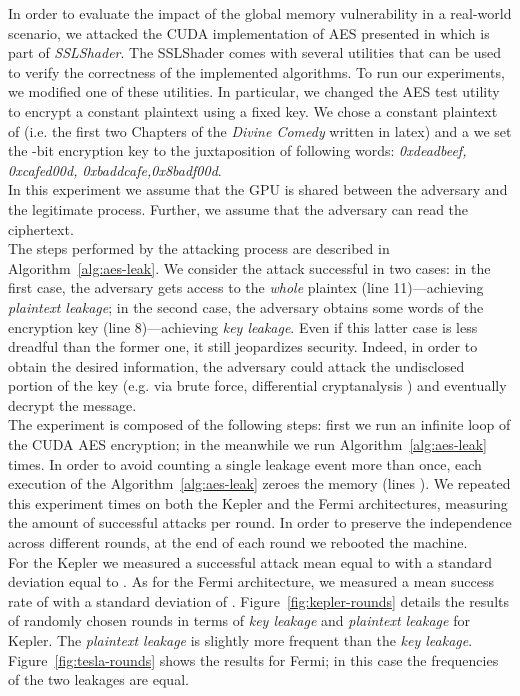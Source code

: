 \documentclass[11pt,onecolumn,letterpaper]{IEEEtran}
\begin{document}
In order to evaluate the impact of the global memory vulnerability in a real-world scenario, we attacked
the CUDA implementation of AES presented in \cite{Jang:2011:SCS:1972457.1972459} which is part of \emph{SSLShader}.  
The SSLShader comes with several utilities that can be used to verify the correctness of the implemented algorithms. 
To run our experiments, we modified one of these utilities. 
In particular, we changed the AES test utility to encrypt a constant plaintext using a fixed key. 
We chose a constant plaintext of  (i.e. the first two Chapters of the \emph{Divine Comedy} written in latex) 
and a we set the -bit encryption key to the juxtaposition of following words: \emph{0xdeadbeef, 0xcafed00d, 0xbaddcafe,0x8badf00d}. \\
In this experiment we assume that the GPU is shared between the adversary and the legitimate process. 
Further, we assume that the adversary can read the ciphertext. \\
The steps performed by the attacking process are described in Algorithm~\ref{alg:aes-leak}. 
We consider the attack successful in two cases:
in the first case, the adversary gets access to the \emph{whole} plaintex (line 11)---achieving \emph{plaintext leakage}; 
in the second case, the adversary obtains some words of the encryption key (line 8)---achieving \emph{key leakage}.
Even if this latter case is less dreadful than the former one, it still jeopardizes security. 
Indeed, in order to obtain the desired information, the adversary could attack the undisclosed portion of the key (e.g. via brute force, differential cryptanalysis \cite{Heys:2002:TLD:763194.763197}) and eventually decrypt the message. \\
The experiment is composed of the following steps: 
first we run an infinite loop of the CUDA AES encryption; 
in the meanwhile we run Algorithm~\ref{alg:aes-leak}  times. 
In order to avoid counting a single leakage event more than once, each execution of the Algorithm~\ref{alg:aes-leak} zeroes the memory (lines ). 
We repeated this experiment  times on both the Kepler and the Fermi architectures, measuring the amount of successful attacks per round. 
In order to preserve the independence across different rounds, at the end of each round we rebooted the machine. \\
For the Kepler we measured a successful attack mean equal to  with a standard deviation equal to .
As for the Fermi architecture, we measured a mean success rate of  with a standard deviation of . 
Figure~\ref{fig:kepler-rounds} details the results of  randomly chosen rounds in terms of \emph{key leakage} and \emph{plaintext leakage} for Kepler. 
The \emph{plaintext leakage} is slightly more frequent than the \emph{key leakage}. 
Figure~\ref{fig:tesla-rounds} shows the results for Fermi; in this case the frequencies of the two leakages are equal. \\	
\end{document}
